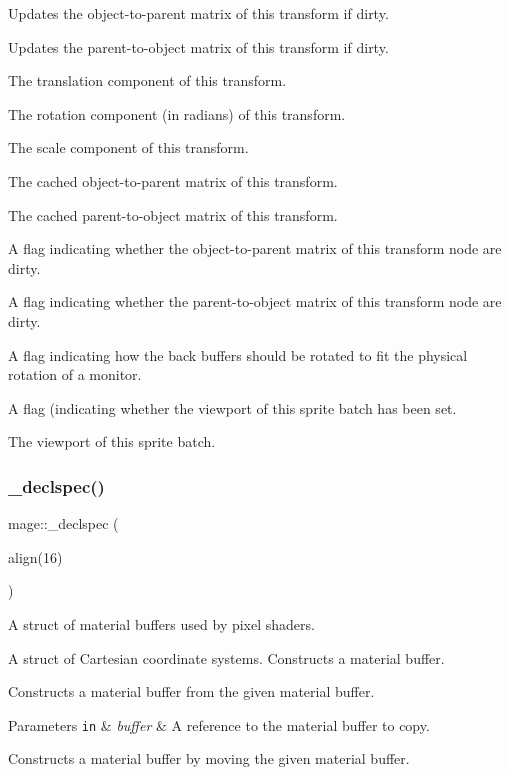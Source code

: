 Updates the object-\/to-\/parent matrix of this transform if dirty.

Updates the parent-\/to-\/object matrix of this transform if dirty.

The translation component of this transform.

The rotation component (in radians) of this transform.

The scale component of this transform.

The cached object-\/to-\/parent matrix of this transform.

The cached parent-\/to-\/object matrix of this transform.

A flag indicating whether the object-\/to-\/parent matrix of this transform node are dirty.

A flag indicating whether the parent-\/to-\/object matrix of this transform node are dirty.

A flag indicating how the back buffers should be rotated to fit the physical rotation of a monitor.

A flag (indicating whether the viewport of this sprite batch has been set.

The viewport of this sprite batch.\hypertarget{namespacemage_a76dac28d69746bdef408a08c36a7c862}{}\label{namespacemage_a76dac28d69746bdef408a08c36a7c862} 
\subsubsection{\texorpdfstring{\+\_\+declspec()}{\_declspec()}}
{\footnotesize\ttfamily mage\+::\+\_\+declspec (\begin{DoxyParamCaption}\item[{align(16)}]{ }\end{DoxyParamCaption})\hspace{0.3cm}{\ttfamily [final]}}

A struct of material buffers used by pixel shaders.

A struct of Cartesian coordinate systems. Constructs a material buffer.

Constructs a material buffer from the given material buffer.


\begin{DoxyParams}[1]{Parameters}
\mbox{\tt in}  & {\em buffer} & A reference to the material buffer to copy.\\
\hline
\end{DoxyParams}
Constructs a material buffer by moving the given material buffer.


